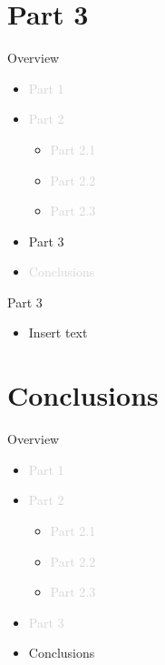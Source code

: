 \documentclass[aspectratio=169]{beamer}
\begin{document}
\section{Part 3}
\begin{frame}{Overview}
    \begin{itemize}
        \item \textcolor{lightgrey}{Part 1}
        \vspace{2mm}
        \item \textcolor{lightgrey}{Part 2}
        \vspace{2mm}
        \begin{itemize}
            \item \textcolor{lightgrey}{Part 2.1}
            \item \textcolor{lightgrey}{Part 2.2}
            \item \textcolor{lightgrey}{Part 2.3}
        \end{itemize}
        \vspace{2mm}
        \item Part 3
        \vspace{2mm}
        \item \textcolor{lightgrey}{Conclusions}
    \end{itemize}
\end{frame}

\begin{frame}{Part 3}
    \begin{itemize}
        \item Insert text
    \end{itemize}
\end{frame}

\section{Conclusions}
\begin{frame}{Overview}
    \begin{itemize}
        \item \textcolor{lightgrey}{Part 1}
        \vspace{2mm}
        \item \textcolor{lightgrey}{Part 2}
        \vspace{2mm}
        \begin{itemize}
            \item \textcolor{lightgrey}{Part 2.1}
            \item \textcolor{lightgrey}{Part 2.2}
            \item \textcolor{lightgrey}{Part 2.3}
        \end{itemize}
        \vspace{2mm}
        \item \textcolor{lightgrey}{Part 3}
        \vspace{2mm}
        \item Conclusions
    \end{itemize}
\end{frame}
\end{document}
